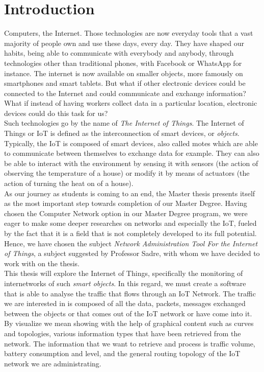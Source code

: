 \chapter*{Introduction}

Computers, the Internet. Those technologies are now everyday tools that a vast majority of people own and use these days, every day. They have shaped our habits, being able to communicate with everybody and anybody, through technologies other than traditional phones, with Facebook or WhatsApp for instance. The internet is now available on smaller objects, more famously on smartphones and smart tablets. But what if other electronic devices could be connected to the Internet and could communicate and exchange information? What if instead of having workers collect data in a particular location, electronic devices could do this task for us?\\

Such technologies go by the name of \textit{The Internet of Things}. The Internet of Things or IoT is defined as the interconnection of smart devices, or \textit{objects}. Typically, the IoT is composed of smart devices, also called motes which are able to communicate between themselves to exchange data for example. They can also be able to interact with the environment by sensing it with sensors (the action of observing the temperature of a house) or modify it by means of actuators (the action of turning the heat on of a house).\\

As our journey as students is coming to an end, the Master thesis presents itself as the most important step towards completion of our Master Degree.  Having chosen the Computer Network option in our Master Degree program, we were eager to make some deeper researches on networks and especially the IoT, fueled by the fact that it is a field that is not completely developed to its full potential. Hence, we have chosen the subject \textit{Network Administration Tool For the Internet of Things}, a subject suggested by Professor Sadre, with whom we have decided to work with on the thesis. \\

This thesis will explore the Internet of Things, specifically the monitoring of internetworks of such \textit{smart objects}.  In this regard, we must create a software that is able to analyse the traffic that flows through an IoT Network. The traffic we are interested in is composed of all the data, packets, messages exchanged between the objects or that comes out of the IoT network or have come into it. By visualize we mean showing with the help of graphical content such as curves and topologies, various information types that have been retrieved from the network. The information that we want to retrieve and process is traffic volume, battery consumption and level, and the general routing topology of the IoT network we are administrating.

